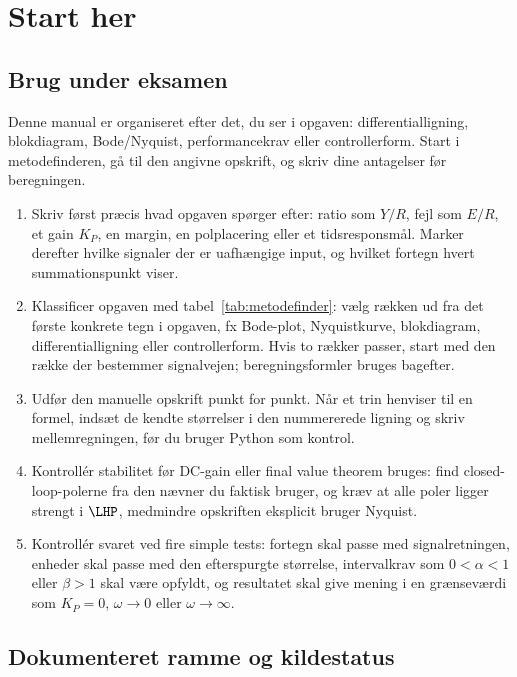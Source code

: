 \section{Start her}
\label{sec:start}

\subsection{Brug under eksamen}

Denne manual er organiseret efter det, du ser i opgaven: differentialligning, blokdiagram,
Bode/Nyquist, performancekrav eller controllerform. Start i metodefinderen, gå til den
angivne opskrift, og skriv dine antagelser før beregningen.

\begin{enumerate}
\item Skriv først præcis hvad opgaven spørger efter: ratio som \(Y/R\), fejl som
      \(E/R\), et gain \(K_P\), en margin, en polplacering eller et tidsresponsmål.
      Marker derefter hvilke signaler der er uafhængige input, og hvilket fortegn hvert
      summationspunkt viser.
\item Klassificer opgaven med tabel~\ref{tab:metodefinder}: vælg rækken ud fra det
      første konkrete tegn i opgaven, fx Bode-plot, Nyquistkurve, blokdiagram,
      differentialligning eller controllerform. Hvis to rækker passer, start med den
      række der bestemmer signalvejen; beregningsformler bruges bagefter.
\item Udfør den manuelle opskrift punkt for punkt. Når et trin henviser til en formel,
      indsæt de kendte størrelser i den nummererede ligning og skriv mellemregningen,
      før du bruger Python som kontrol.
\item Kontrollér stabilitet før DC-gain eller final value theorem bruges: find
      closed-loop-polerne fra den nævner du faktisk bruger, og kræv at alle poler
      ligger strengt i \(\LHP\), medmindre opskriften eksplicit bruger Nyquist.
\item Kontrollér svaret ved fire simple tests: fortegn skal passe med signalretningen,
      enheder skal passe med den efterspurgte størrelse, intervalkrav som
      \(0<\alpha<1\) eller \(\beta>1\) skal være opfyldt, og resultatet skal give mening
      i en grænseværdi som \(K_P=0\), \(\omega\to0\) eller \(\omega\to\infty\).
\end{enumerate}

\subsection{Dokumenteret ramme og kildestatus}

